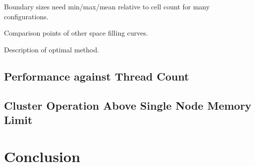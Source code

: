 \documentclass{IIBproject}
\begin{document}
Boundary sizes need min/max/mean relative to cell count for many configurations.

Comparison points of other space filling curves.

Description of optimal method.

\subsection{Performance against Thread Count}

\subsection{Cluster Operation Above Single Node Memory Limit}

\section{Conclusion}

\printbibliography
\end{document}
